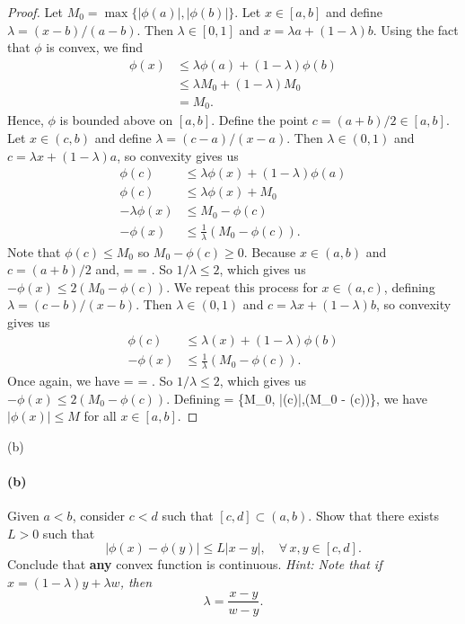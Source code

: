 \documentclass[12pt]{article}
\newenvironment{fullbox}{\begin{lrbox}{\savefullbox}\begin{minipage}{\dimexpr\textwidth-2\fboxsep\relax}}{\end{minipage}\end{lrbox}\begin{center}\framebox[\textwidth]{\usebox{\savefullbox}}\end{center}}
\newenvironment{pbox}[1][]{\begin{fullbox}\ifx#1\empty\else\paragraph{#1}\fi}{\end{fullbox}}
\theoremstyle{definition}
\def\[#1\]{\begin{align*}#1\end{align*}}
\begin{document}
\begin{proof}
    Let $M_0 = \max\{|\phi(a)|, |\phi(b)|\}$. Let $x \in [a, b]$ and define $\lambda = (x - b)/(a - b)$. Then $\lambda \in [0, 1]$ and $x = \lambda a + (1 - \lambda)b$. Using the fact that $\phi$ is convex, we find
    \begin{align*}
        \phi(x)
            &\leq \lambda\phi(a) + (1-\lambda)\phi(b) \\
            &\leq \lambda M_0 + (1-\lambda)M_0 \\
            &= M_0.
    \end{align*}
    Hence, $\phi$ is bounded above on $[a, b]$. Define the point $c = (a+b)/2 \in [a, b]$. Let $x \in (c, b)$ and define $\lambda = (c - a)/(x - a)$. Then $\lambda \in (0, 1)$ and $c = \lambda x + (1-\lambda)a$, so convexity gives us
    \begin{align*}
        \phi(c) &\leq \lambda\phi(x) + (1-\lambda)\phi(a) \\
        \phi(c) &\leq \lambda\phi(x) + M_0 \\
        -\lambda\phi(x) &\leq M_0 - \phi(c) \\
        -\phi(x) &\leq \frac{1}{\lambda}(M_0 - \phi(c)).
    \end{align*}
    Note that $\phi(c) \leq M_0$ so $M_0 - \phi(c) \geq 0$. Because $x \in (a, b)$ and $c = (a+b)/2$ and,
    \[
        \lambda
            = 
            \geq {}
            = .
    \]
    So $1/\lambda \leq 2$, which gives us $-\phi(x) \leq 2(M_0 - \phi(c))$. We repeat this process for $x \in (a, c)$, defining $\lambda = (c-b)/(x-b)$. Then $\lambda \in (0, 1)$ and $c = \lambda x + (1 - \lambda)b$, so convexity gives us
    \begin{align*}
        \phi(c) &\leq \lambda(x) + (1-\lambda)\phi(b) \\
        -\phi(x) &\leq \frac{1}{\lambda}(M_0 - \phi(c)).
    \end{align*}
    Once again, we have
    \[
        \lambda
            = 
            \geq {}
            = .
    \]
    So $1/\lambda \leq 2$, which gives us $-\phi(x) \leq 2(M_0 - \phi(c))$. Defining
    \[
        M = \max\{M_0,\; |\phi(c)|,(M_0 - \phi(c))\},
    \]
    we have $|\phi(x)| \leq M$ for all $x \in [a, b]$.
    
    
\end{proof}

\begin{pbox}[(b)]
    Given $a<b$, consider $c<d$ such that $[c,d] \subset (a,b)$.  Show that there exists $L>0$ such that 
    \begin{equation}
    |\phi(x)-\phi(y)|\le L |x-y|,\quad \forall\,x,y\in [c,d].
    \end{equation}
    Conclude that {\bf any} convex function is continuous.
    {\it Hint: Note that if $x= (1-\lambda)y+\lambda w$, then 
    \begin{equation}
    \lambda = \frac{x-y}{w-y}.
    \end{equation}
    }
\end{pbox}
\end{document}
